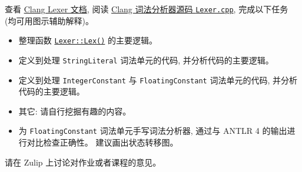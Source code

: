 \documentclass[a4paper, justified]{tufte-handout}
\begin{document}
\begin{problem}[词法分析器代码分析]
  查看 \href{https://clang.llvm.org/doxygen/classclang_1_1Lexer.html}{Clang Lexer 文档},
  阅读 \href{https://clang.llvm.org/doxygen/Lexer_8cpp_source.html}{Clang 词法分析器源码 \texttt{Lexer.cpp}},
  完成以下任务 (均可用图示辅助解释)。
  \begin{itemize}
    \item 整理函数 \href{https://clang.llvm.org/doxygen/Lexer_8cpp_source.html\#l03669}{\texttt{Lexer::Lex()}}
      的主要逻辑。
    \item 定义到处理 \texttt{StringLiteral} 词法单元的代码,
      并分析代码的主要逻辑。
    \item 定义到处理 \texttt{IntegerConstant} 与 \texttt{FloatingConstant} 词法单元的代码,
      并分析代码的主要逻辑。
    \item 其它: 请自行挖掘有趣的内容。
  \end{itemize}
\end{problem}

\begin{solution}
\end{solution}

\beginoptional
\begin{problem}[手写词法分析器]
  \begin{itemize}
    \item 为 \texttt{FloatingConstant} 词法单元手写词法分析器,
      通过与 ANTLR 4 的输出进行对比检查正确性。
      建议画出状态转移图。
  \end{itemize}
\end{problem}

\begin{solution}
\end{solution}



\beginfb

请在 Zulip 上讨论对作业或者课程的意见。
\end{document}
